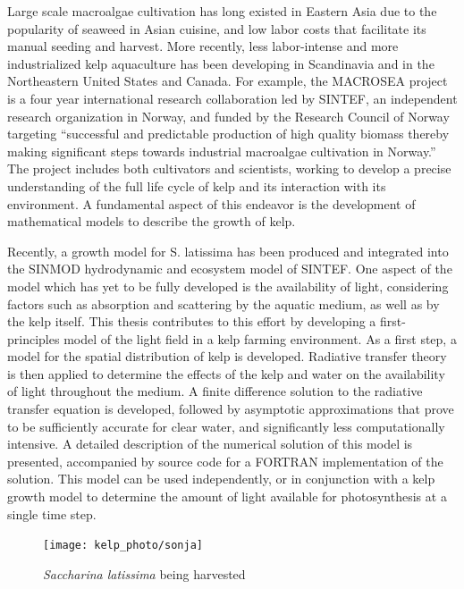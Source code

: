 \documentclass[ms,cpyr,lof,lot]{uathesis}
\begin{document}
Large scale macroalgae cultivation has long existed in Eastern Asia due to the popularity of seaweed in Asian cuisine, and low labor costs that facilitate its manual seeding and harvest.
  More recently, less labor-intense and more industrialized kelp aquaculture has been developing in Scandinavia and in the Northeastern United States and Canada.
For example, the MACROSEA project is a four year international research collaboration led by SINTEF, an independent research organization in Norway, and funded by the Research Council of Norway targeting ``successful and predictable production of high quality biomass thereby making significant steps towards industrial macroalgae cultivation in Norway.'' 
The project includes both cultivators and scientists, working to develop a precise understanding of the full life cycle of kelp and its interaction with its environment.
A fundamental aspect of this endeavor is the development of mathematical models to describe the growth of kelp.

Recently, a growth model\cite{broch_modelling_2012} for S. latissima has been produced and integrated into the SINMOD\cite{wassmann_modelling_2006} hydrodynamic and ecosystem model of SINTEF.
One aspect of the model which has yet to be fully developed is the availability of light, considering factors such as absorption and scattering by the aquatic medium, as well as by the kelp itself.
This thesis contributes to this effort by developing a first-principles model of the light field in a kelp farming environment.
As a first step, a model for the spatial distribution of kelp is developed.
Radiative transfer theory is then applied to determine the effects of the kelp and water on the availability of light throughout the medium.
A finite difference solution to the radiative transfer equation is developed, followed by asymptotic approximations that prove to be sufficiently accurate for clear water, and significantly less computationally intensive.
A detailed description of the numerical solution of this model is presented, accompanied by source code for a FORTRAN implementation of the solution.
This model can be used independently, or in conjunction with a kelp growth model to determine the amount of light available for photosynthesis at a single time step.

\begin{figure}[h]
  \centering
  \texttt{[image: kelp\_photo/sonja]}
  \caption{\textit{Saccharina latissima} being harvested}
\end{figure}
\end{document}
